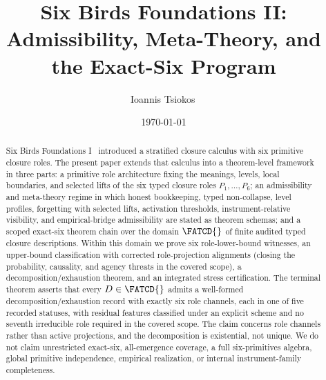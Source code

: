 \title{Six Birds Foundations II:\\[4pt]
Admissibility, Meta-Theory, and the Exact-Six Program}
\author{Ioannis Tsiokos\,}
\date{\today}

\maketitle
\thispagestyle{firstpage}

%
\begin{abstract}
\noindent
Six Birds Foundations I~\citep{Tsiokos2026SixBirdsFoundations}
introduced a stratified closure calculus with six primitive closure
roles. The present paper extends that calculus
into a theorem-level framework in three parts: a primitive role
architecture fixing the meanings, levels, local boundaries, and
selected lifts of the six typed closure roles \(P_1,\ldots,P_6\); an
admissibility and meta-theory regime in which honest bookkeeping,
typed non-collapse, level profiles, forgetting with selected lifts,
activation thresholds, instrument-relative visibility, and
empirical-bridge admissibility are stated as theorem schemas; and a
scoped exact-six theorem chain over the domain \(\FATCD{}\) of finite
audited typed closure descriptions. Within this domain we prove six
role-lower-bound witnesses, an upper-bound classification with
corrected role-projection alignments (closing the probability,
causality, and agency threats in the covered scope), a
decomposition/exhaustion theorem, and an integrated stress
certification. The terminal theorem asserts that every
\(D \in \FATCD{}\) admits a well-formed decomposition/exhaustion
record with exactly six role channels, each in one of five recorded
statuses, with residual features classified under an explicit scheme
and no seventh irreducible role required in the covered scope. The
claim concerns role channels rather than active projections, and the
decomposition is existential, not unique. We do not claim unrestricted
exact-six, all-emergence coverage, a full six-primitives algebra,
global primitive independence, empirical realization, or internal
instrument-family completeness.
\end{abstract}
